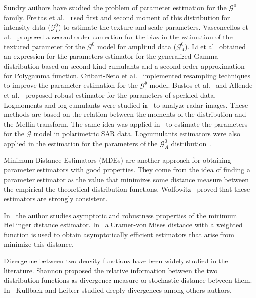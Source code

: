 \documentclass[journal]{IEEEtran}
\numberwithin{equation}{section}
\begin{document}
Sundry authors have studied the problem of parameter estimation for the $\mathcal G^0$ family. 
Freitas et al.~\cite{Freitas2005} used first and second moment of this distribution for intensity data ($\mathcal G_I^0$) to estimate the texture and scale parameters. 
Vasconcellos et al.~\cite{VasconcellosFrerySilva:CompStat} proposed a second order correction for the bias in the estimation of the textured parameter for the $\mathcal G^0$ model for amplitud data ($\mathcal G_A^0$).  
Li et al~\cite{Li2011} obtained an  expression for the parameters estimator for the generalized Gamma distribution based on second-kind cumulants and a second-order approximation for  Polygamma  function. Cribari-Neto et al.~\cite{CribariFrerySilva:CSDA} implemented resampling techniques to improve the parameter estimation for the $\mathcal G_I^0$ model. 
Bustos et al.~\cite{BustosFreryLucini:Mestimators:2001} and Allende et al.~\cite{AllendeFreryetal:JSCS:05} proposed robust estimator for the parameters of speckled data. Logmoments and log-cumulants were studied in~\cite{nicolas2002} to analyze radar images. 
These methods are based on the relation between the moments of the distribution and the Mellin transform. 
The same idea was applied in~\cite{khan2014} to estimate the parameters for the $\mathcal{G}$ model in polarimetric SAR data. 
Logcumulants estimators were also applied in the estimation for the parameters of the $\mathcal G_A^0$ distribution~\cite{Tison2004}. 

Minimum Distance Estimators (MDEs) are another approach for obtaining parameter estimators with good properties.
They come from the idea of finding a parameter estimator as the value that minimizes some  distance measure between the empirical the  theoretical distribution functions. Wolfowitz~\cite{wolfowitz1953,wolfowitz1957} proved that these estimators are strongly consistent.

In~\cite{beran1977} the author studies asymptotic and robustness properties of the minimum Hellinger distance estimator. 
In~\cite{Boos1981} a Cramer-von Mises distance with a weighted function is used to obtain asymptotically efficient estimators that arise from minimize this distance.

Divergence between two density functions have been widely studied in the literature. 
Shannon proposed the relative information between the two distribution functions as divergence measure or stochastic distance between them. In~\cite{KullbackBook1968,KullbackLeibler1951} Kullback and Leibler studied deeply divergences among others authors. 
\end{document}
